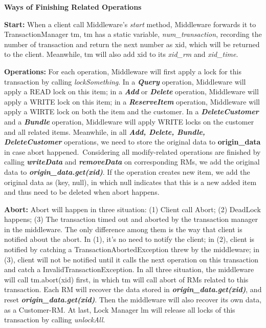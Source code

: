 \documentclass[a4paper, 11pt]{ctexart}
\newcommand{\newPart}[1]{\textbf{\large #1}}
\begin{document}
\newPart{Ways of Finishing Related Operations}

\textbf{Start:} When a client call Middleware's \textit{start} method, Middleware forwards it to TransactionManager tm, tm has a static variable, \textit{num\_transaction}, recording the number of transaction and return the next number as xid, which will be returned to the client. Meanwhile, tm will also add xid to its \textit{xid\_rm} and \textit{xid\_time}.

\textbf{Operations:} For each operation, Middleware will first apply a lock for this transaction by calling \textit{lockSomething}. In a \textbf{\textit{Query}} operation, Middleware will apply a READ lock on this item; in a \textbf{\textit{Add}} or \textbf{\textit{Delete}} operation, Middleware will apply a WRITE lock on this item; in a \textbf{\textit{ReserveItem}} operation, Middleware will apply a WIRTE lock on both the item and the customer. In a \textbf{\textit{DeleteCustomer}} and a \textbf{\textit{Bundle}} operation, Middleware will apply WRITE locks on the customer and all related items. Meanwhile, in all \textbf{\textit{Add, Delete, Bundle, DeleteCustomer}} operations, we need to store the original data to \textbf{origin\_data} in case abort happened. Considering all modify-related operations are finished by calling \textbf{\textit{writeData}} and \textbf{\textit{removeData}} on corresponding RMs, we add the original data to \textbf{\textit{origin\_data.get(xid)}}. If the operation creates new item, we add the original data as (key, null), in which null indicates that this is a new added item and thus need to be deleted when abort happens. 

\textbf{Abort:} Abort will happen in three situation: (1) Client call Abort; (2) DeadLock happens; (3) The transaction timed out and aborted by the transaction manager in the middleware. The only difference among them is the way that client is notified about the abort. In (1), it's no need to notify the client; in (2), client is notified by catching a TransactionAbortedException threw by the middleware; in (3), client will not be notified until it calls the next operation on this transaction and catch a InvalidTransactionException. In all three situation, the middleware will call tm.abort(xid) first, in which tm will call abort of RMs related to this transaction. Each RM will recover the data stored in \textbf{\textit{origin\_data.get(xid)}}, and reset \textbf{\textit{origin\_data.get(xid)}}. Then the middleware will also recover its own data, as a Customer-RM. At last, Lock Manager lm will release all locks of this transaction by calling \textit{unlockAll}.
\end{document}
